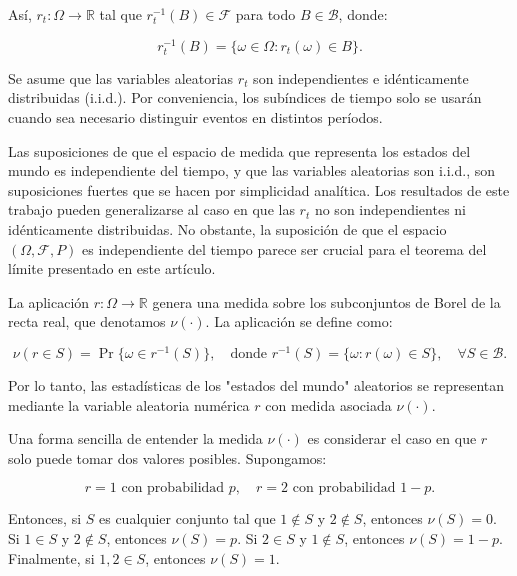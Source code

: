 \documentclass[a4paper,12pt]{article}
\begin{document}
Así, \( r_t: \Omega \to \mathbb{R} \) tal que \( r_t^{-1}(B) \in \mathcal{F} \) para todo \( B \in \mathcal{B} \), donde:

		\begin{equation}
r_t^{-1}(B) = \{ \omega \in \Omega : r_t(\omega) \in B \}.
		\end{equation}

Se asume que las variables aleatorias \( r_t \) son independientes e idénticamente distribuidas (i.i.d.). Por conveniencia, los subíndices de tiempo solo se usarán cuando sea necesario distinguir eventos en distintos períodos.

Las suposiciones de que el espacio de medida que representa los estados del mundo es independiente del tiempo, y que las variables aleatorias son i.i.d., son suposiciones fuertes que se hacen por simplicidad analítica. Los resultados de este trabajo pueden generalizarse al caso en que las \( r_t \) no son independientes ni idénticamente distribuidas. No obstante, la suposición de que el espacio \( (\Omega, \mathcal{F}, P) \) es independiente del tiempo parece ser crucial para el teorema del límite presentado en este artículo.

La aplicación \( r: \Omega \to \mathbb{R} \) genera una medida sobre los subconjuntos de Borel de la recta real, que denotamos \( \nu(\cdot) \). La aplicación se define como:

		\begin{equation}
\nu(r \in S) = \Pr\{ \omega \in r^{-1}(S) \},
\quad \text{donde } r^{-1}(S) = \{ \omega : r(\omega) \in S \},
\quad \forall S \in \mathcal{B}.
		\end{equation}

Por lo tanto, las estadísticas de los "estados del mundo" aleatorios se representan mediante la variable aleatoria numérica \( r \) con medida asociada \( \nu(\cdot) \).

Una forma sencilla de entender la medida \( \nu(\cdot) \) es considerar el caso en que \( r \) solo puede tomar dos valores posibles. Supongamos:

		\begin{equation}
r = 1 \text{ con probabilidad } p, \quad
r = 2 \text{ con probabilidad } 1 - p.
		\end{equation}

Entonces, si \( S \) es cualquier conjunto tal que \( 1 \notin S \) y \( 2 \notin S \), entonces \( \nu(S) = 0 \). Si \( 1 \in S \) y \( 2 \notin S \), entonces \( \nu(S) = p \). Si \( 2 \in S \) y \( 1 \notin S \), entonces \( \nu(S) = 1 - p \). Finalmente, si \( 1, 2 \in S \), entonces \( \nu(S) = 1 \).
\end{document}
